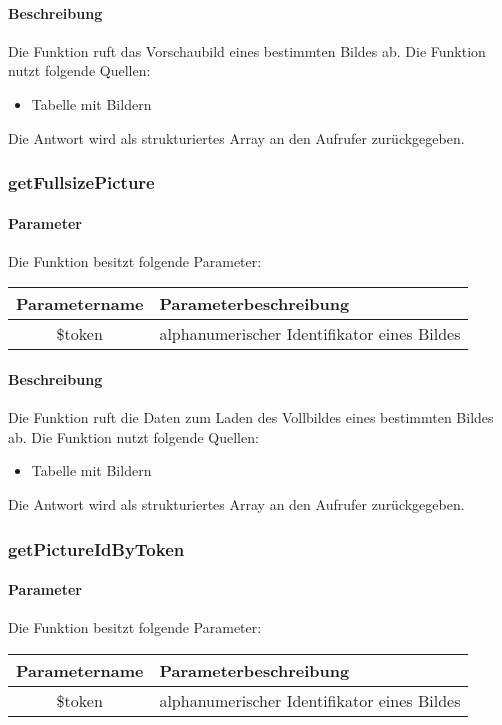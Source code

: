 \paragraph{Beschreibung} Die Funktion ruft das Vorschaubild eines bestimmten Bildes ab. Die Funktion nutzt folgende Quellen:
\begin{itemize}
	\item Tabelle mit Bildern
\end{itemize}
Die Antwort wird als strukturiertes Array an den Aufrufer zurückgegeben.
\subsubsection{getFullsizePicture}
\paragraph{Parameter} Die Funktion besitzt folgende Parameter:
\begin{table}[H]
	\begin{tabular}{|c|p{11cm}|}
		\hline
		\textbf{Parametername} & \textbf{Parameterbeschreibung} \\ \hline
		\$token & alphanumerischer Identifikator eines Bildes \\ \hline
	\end{tabular}
\end{table}
\paragraph{Beschreibung} Die Funktion ruft die Daten zum Laden des Vollbildes eines bestimmten Bildes ab. Die Funktion nutzt folgende Quellen:
\begin{itemize}
	\item Tabelle mit Bildern
\end{itemize}
Die Antwort wird als strukturiertes Array an den Aufrufer zurückgegeben.
\subsubsection{getPictureIdByToken}
\paragraph{Parameter} Die Funktion besitzt folgende Parameter:
\begin{table}[H]
	\begin{tabular}{|c|p{11cm}|}
		\hline
		\textbf{Parametername} & \textbf{Parameterbeschreibung} \\ \hline
		\$token & alphanumerischer Identifikator eines Bildes \\ \hline
	\end{tabular}
\end{table}
